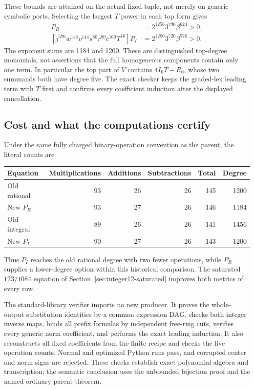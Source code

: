 These bounds are attained on the actual fixed tuple, not merely on generic
symbolic ports.  Selecting the largest $T$ power in each top form gives
\begin{align*}
 [j^{624}w^{144}v^{160}s^{64}r^{56}c^{112}h^{16}T^8]P_R
   &=2^{1256}3^{796}\beta^{624}>0,\\
 [j^{576}w^{144}v^{144}s^{80}r^{80}c^{160}T^{16}]P_I
   &=2^{1200}3^{720}\beta^{576}>0.
\end{align*}
The exponent sums are 1184 and 1200.  These are distinguished top-degree
monomials, not assertions that the full homogeneous components contain
only one term.  In particular the top part of $V$ contains
$4I_0T-R_0$, whose two summands both have degree five.  The exact checker
keeps the graded-lex leading term with $T$ first and confirms every
coefficient induction after the displayed cancellation.

\subsection{Cost and what the computations certify}

Under the same fully charged binary-operation convention as the parent,
the literal counts are
\begin{center}
\begin{tabular}{lrrrrr}
Equation&Multiplications&Additions&Subtractions&Total&Degree\\\hline
Old rational&93&26&26&145&1200\\
New $P_R$&93&27&26&146&1184\\
Old integral&89&26&26&141&1456\\
New $P_I$&90&27&26&143&1200
\end{tabular}
\end{center}
Thus $P_I$ reaches the old rational degree with two fewer operations,
while $P_R$ supplies a lower-degree option within this historical
comparison.  The saturated $123/1084$ equation of
Section~\ref{sec:integer12-saturated} improves both metrics of every row.

The standard-library verifier imports no new producer.  It proves the
whole-output substitution identities by a common expression DAG, checks
both integer inverse maps, binds all prefix formulas by independent
free-ring cuts, verifies every generic norm coefficient, and performs
the exact leading induction.  It also reconstructs all fixed coefficients
from the finite recipe and checks the live operation counts.  Normal and
optimized Python runs pass, and corrupted center and norm signs are
rejected.  These checks establish exact polynomial algebra and
transcription; the semantic conclusion uses the unbounded bijection proof
and the named ordinary parent theorem.
